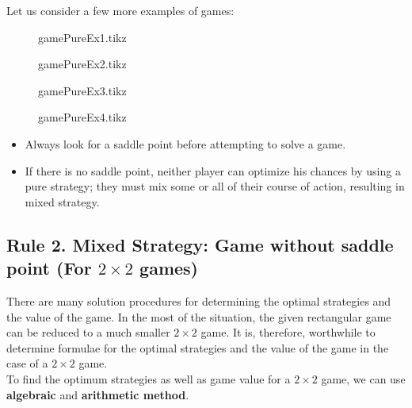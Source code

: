 \documentclass[../main-sheet.tex]{subfiles}
\begin{document}
Let us consider a few more examples of games:
\begin{ex}\hfill
    \begin{figure}[H]
        \centering
        {gamePureEx1.tikz}
    \end{figure}
\end{ex}
\begin{ex}\hfill
    \begin{figure}[H]
        \centering
        {gamePureEx2.tikz}
    \end{figure}
\end{ex}
\begin{ex}\hfill
    \begin{figure}[H]
        \centering
        {gamePureEx3.tikz}
    \end{figure}
\end{ex}
\begin{ex}\hfill
    \begin{figure}[H]
        \centering
        {gamePureEx4.tikz}
    \end{figure}
\end{ex}
\begin{note}
    \hfill
    \begin{itemize}
        \item Always look for a saddle point before attempting to solve a game.
        \item If there is no saddle point, neither player can optimize his chances by using a pure strategy; they must mix some or all of their course of action, resulting in mixed strategy.
    \end{itemize}
\end{note}
\subsection{Rule 2. Mixed Strategy: Game without saddle point (For \(2\times 2\) games)}
There are many solution procedures for determining the optimal strategies and the value of the game. In the most of the situation, the given rectangular game can be reduced to a much smaller \(2\times 2\) game. It is, therefore, worthwhile to determine formulae for the optimal strategies and the value of the game in the case of a \(2\times 2\) game.\\
To find the optimum strategies as well as game value for a \(2\times 2\) game, we can use \textbf{algebraic} and \textbf{arithmetic method}.
\end{document}
